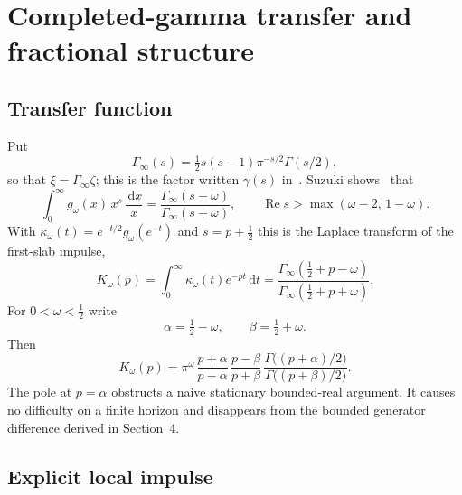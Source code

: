 \documentclass[11pt,a4paper]{article}
\newcommand{\Ginf}{\Gamma_{\!\infty}}
\renewcommand{\Re}{\operatorname{Re}}
\newcommand{\dd}{\,\mathrm d}
\theoremstyle{plain}
\theoremstyle{definition}
\numberwithin{equation}{section}
\begin{document}
\section{Completed-gamma transfer and fractional structure}

\subsection{Transfer function}

Put
\begin{equation}
\Ginf(s)=\tfrac12 s(s-1)\pi^{-s/2}\Gamma(s/2),
\end{equation}
so that $\xi=\Ginf\zeta$; this is the factor written $\gamma(s)$
in~\cite{Suzuki2012}. Suzuki shows~\cite[Sect.~3.1]{Suzuki2012} that
\begin{equation}\label{eq:suzuki-mellin}
\int_0^\infty g_\omega(x)\,x^{s}\,\frac{\dd x}{x}
=\frac{\Ginf(s-\omega)}{\Ginf(s+\omega)},
\qquad \Re s>\max(\omega-2,\,1-\omega).
\end{equation}
With $\kappa_\omega(t)=e^{-t/2}g_\omega(e^{-t})$ and $s=p+\tfrac12$ this is
the Laplace transform of the first-slab impulse,
\begin{equation}\label{eq:K}
K_\omega(p)=\int_0^\infty\kappa_\omega(t)e^{-pt}\dd t
=\frac{\Ginf(\tfrac12+p-\omega)}{\Ginf(\tfrac12+p+\omega)} .
\end{equation}
For $0<\omega<\tfrac12$ write
\begin{equation}
\alpha=\tfrac12-\omega,\qquad\beta=\tfrac12+\omega .
\end{equation}
Then
\begin{equation}\label{eq:K-factored}
K_\omega(p)=\pi^{\omega}\,\frac{p+\alpha}{p-\alpha}\,\frac{p-\beta}{p+\beta}\,
\frac{\Gamma\bigl((p+\alpha)/2\bigr)}{\Gamma\bigl((p+\beta)/2\bigr)} .
\end{equation}
The pole at $p=\alpha$ obstructs a naive stationary bounded-real argument. It
causes no difficulty on a finite horizon and disappears from the bounded
generator difference derived in Section~4.

\subsection{Explicit local impulse}
\end{document}
